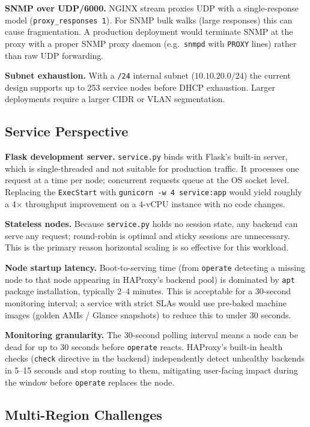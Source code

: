 \documentclass[conference]{IEEEtran}
\begin{document}
\textbf{SNMP over UDP/6000.}
NGINX stream proxies UDP with a single-response model
(\texttt{proxy\_responses 1}).  For SNMP bulk walks (large responses)
this can cause fragmentation.  A production deployment would terminate
SNMP at the proxy with a proper SNMP proxy daemon (e.g.\ \texttt{snmpd}
with \texttt{PROXY} lines) rather than raw UDP forwarding.

\textbf{Subnet exhaustion.}
With a \texttt{/24} internal subnet ($10.10.20.0/24$) the current
design supports up to 253 service nodes before DHCP exhaustion.
Larger deployments require a larger CIDR or VLAN segmentation.

\subsection{Service Perspective}

\textbf{Flask development server.}
\texttt{service.py} binds with Flask's built-in server, which is
single-threaded and not suitable for production traffic.  It processes
one request at a time per node; concurrent requests queue at the OS
socket level.  Replacing the \texttt{ExecStart} with
\texttt{gunicorn -w 4 service:app} would yield roughly a 4$\times$
throughput improvement on a 4-vCPU instance with no code changes.

\textbf{Stateless nodes.}
Because \texttt{service.py} holds no session state, any backend can
serve any request; round-robin is optimal and sticky sessions are
unnecessary.  This is the primary reason horizontal scaling is so
effective for this workload.

\textbf{Node startup latency.}
Boot-to-serving time (from \texttt{operate} detecting a missing node
to that node appearing in HAProxy's backend pool) is dominated by
\texttt{apt} package installation, typically 2--4 minutes.  This is
acceptable for a 30-second monitoring interval; a service with strict
SLAs would use pre-baked machine images (golden AMIs / Glance
snapshots) to reduce this to under 30 seconds.

\textbf{Monitoring granularity.}
The 30-second polling interval means a node can be dead for up to
30 seconds before \texttt{operate} reacts.  HAProxy's built-in health
checks (\texttt{check} directive in the backend) independently detect
unhealthy backends in 5--15 seconds and stop routing to them,
mitigating user-facing impact during the window before \texttt{operate}
replaces the node.

\subsection{Multi-Region Challenges}
\end{document}
